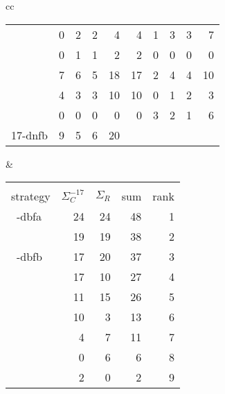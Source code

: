 \documentclass[smallextended]{svjour3}
\newcommand{\dbfa}[1]{1-dbfa}
\newcommand{\dbfb}[1]{2-dbfb}
\newcommand{\dbca}[1]{\ifthenelse{\equal{#1}{0}}{3-dbca}{3-dbca\textsuperscript{#1}}}
\newcommand{\dbcb}[1]{\ifthenelse{\equal{#1}{0}}{4-dbcb}{4-dbcb\textsuperscript{#1}}}
\newcommand{\dnca}[1]{\ifthenelse{\equal{#1}{0}}{7-dnca}{7-dnca\textsuperscript{#1}}}
\newcommand{\dncb}[1]{\ifthenelse{\equal{#1}{0}}{8-dncb}{8-dncb\textsuperscript{#1}}}
\newcommand{\pbfa}[1]{\ifthenelse{\equal{#1}{0}}{9-pbfa}{9-pbfa\textsuperscript{#1}}}
\newcommand{\pbfb}[1]{\ifthenelse{\equal{#1}{0}}{10-pbfb}{10-pbfb\textsuperscript{#1}}}
\newcommand{\pnca}[1]{\ifthenelse{\equal{#1}{0}}{15-pnca}{15-pnca\textsuperscript{#1}}}
\newcommand{\dnfb}[1]{17-dnfb} %
\begin{document}
\begin{table}
\begin{tabular}{cc}
\begin{tabular}{l|rrrrr|rrrr}
~\:\dnca{0}  & 0 & 2 & 2 &  4   &    4 & 1 & 3 & 3 &  7\\
~\:\dncb{0}  & 0 & 1 & 1 &  2   &    2 & 0 & 0 & 0 &  0\\
~\:\pbfa{0}  & 7 & 6 & 5 & 18   &   17 & 2 & 4 & 4 & 10\\
   \pbfb{0}  & 4 & 3 & 3 & 10   &   10 & 0 & 1 & 2 &  3\\
   \pnca{0}  & 0 & 0 & 0 &  0   &    0 & 3 & 2 & 1 &  6\\
   \dnfb{0}  & 9 & 5 & 6 & 20   &      &   &   &   &   \\
\end{tabular}
&
\begin{tabular}{l|rrrr}
\multicolumn{5}{c}{}                                         \\ %
strategy     & $\Sigma_{C}^{-17}$ & $\Sigma_{R}$ & sum & rank\\
\hline
~\:\dbfa{0}  & 24 & 24 & 48 & 1\\
~\:\dbca{0}  & 19 & 19 & 38 & 2\\
~\:\dbfb{0}  & 17 & 20 & 37 & 3\\
~\:\pbfa{0}  & 17 & 10 & 27 & 4\\
~\:\dbcb{0}  & 11 & 15 & 26 & 5\\
   \pbfb{0}  & 10 &  3 & 13 & 6\\
~\:\dnca{0}  &  4 &  7 & 11 & 7\\
   \pnca{0}  &  0 &  6 &  6 & 8\\
~\:\dncb{0}  &  2 &  0 &  2 & 9\\
\end{tabular}
\end{tabular}
\end{table}

\end{document}
